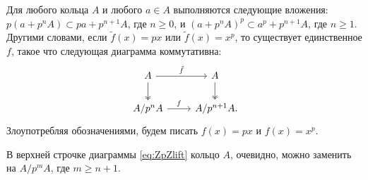 \documentclass[
	extrafontsizes,
	11pt,
	hyphens,
]{memoir}
\begin{document}
\begin{observation}
Для любого кольца \(A\) и любого \(a \in A\) выполняются следующие вложения:
\(p(a + p^n A) \subset pa + p^{n+1} A\),
где \(n \geq 0\),
и
\((a + p^n A)^p \subset a^p + p^{n+1} A\),
где \(n \geq 1\).
Другими словами, если \(\tilde{f}(x)=px\) или \(\tilde{f}(x)=x^p\), то существует единственное \(f\), такое что следующая диаграмма коммутативна:
\begin{equation}
\begin{tikzcd}%
A \ar{r}{\tilde{f}} \ar[twoheadrightarrow]{d} & A \ar[twoheadrightarrow]{d} \\
A/p^nA \ar{r}{f} & A/p^{n+1}A\mathrlap{.}
\end{tikzcd}
\label{eq:ZpZlift}
\end{equation}
Злоупотребляя обозначениями, будем писать \(f(x) = px\) и \(f(x) = x^p\).
\end{observation}

\begin{remark}
В верхней строчке диаграммы \eqref{eq:ZpZlift} кольцо \(A\), очевидно, можно заменить на \(A/p^mA\), где \(m \geq n+1\).
\end{remark}

%
%
%
%
%
%
\end{document}

